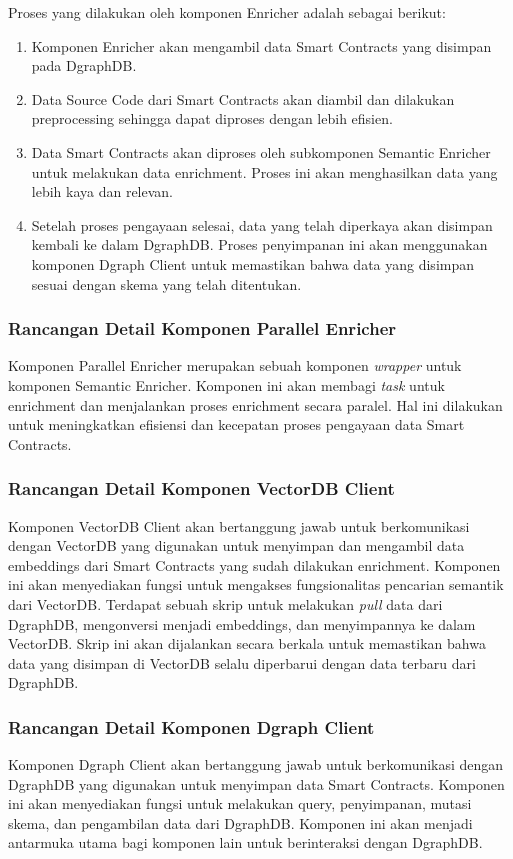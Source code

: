 Proses yang dilakukan oleh komponen Enricher adalah sebagai berikut:
\begin{enumerate}
    \item Komponen Enricher akan mengambil data Smart Contracts yang disimpan pada DgraphDB.
    \item Data Source Code dari Smart Contracts akan diambil dan dilakukan preprocessing sehingga dapat diproses dengan lebih efisien.
    \item Data Smart Contracts akan diproses oleh subkomponen Semantic Enricher untuk melakukan data enrichment. Proses ini akan menghasilkan data yang lebih kaya dan relevan.
    \item Setelah proses pengayaan selesai, data yang telah diperkaya akan disimpan kembali ke dalam DgraphDB. Proses penyimpanan ini akan menggunakan komponen Dgraph Client untuk memastikan bahwa data yang disimpan sesuai dengan skema yang telah ditentukan.
\end{enumerate}


\subsubsection{Rancangan Detail Komponen Parallel Enricher}

Komponen Parallel Enricher merupakan sebuah komponen \textit{wrapper} untuk komponen Semantic Enricher. Komponen ini akan membagi \textit{task} untuk enrichment dan menjalankan proses enrichment secara paralel. Hal ini dilakukan untuk meningkatkan efisiensi dan kecepatan proses pengayaan data Smart Contracts.

\subsubsection{Rancangan Detail Komponen VectorDB Client}

Komponen VectorDB Client akan bertanggung jawab untuk berkomunikasi dengan VectorDB yang digunakan untuk menyimpan dan mengambil data embeddings dari Smart Contracts yang sudah dilakukan enrichment. Komponen ini akan menyediakan fungsi untuk mengakses fungsionalitas pencarian semantik dari VectorDB. Terdapat sebuah skrip untuk melakukan \textit{pull} data dari DgraphDB, mengonversi menjadi embeddings, dan menyimpannya ke dalam VectorDB. Skrip ini akan dijalankan secara berkala untuk memastikan bahwa data yang disimpan di VectorDB selalu diperbarui dengan data terbaru dari DgraphDB.

\subsubsection{Rancangan Detail Komponen Dgraph Client}

Komponen Dgraph Client akan bertanggung jawab untuk berkomunikasi dengan DgraphDB yang digunakan untuk menyimpan data Smart Contracts. Komponen ini akan menyediakan fungsi untuk melakukan query, penyimpanan, mutasi skema, dan pengambilan data dari DgraphDB. Komponen ini akan menjadi antarmuka utama bagi komponen lain untuk berinteraksi dengan DgraphDB.


